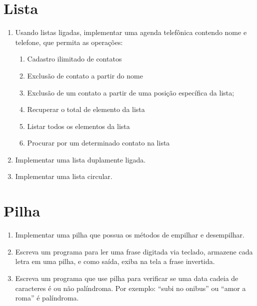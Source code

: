 \documentclass[11pt]{article}
\begin{document}
\newpage
\section{Lista}

\begin{enumerate}
	
	\item Usando listas ligadas, implementar uma agenda telefônica contendo nome e telefone, que permita as operações:
	
	\begin{enumerate}
		
		\item Cadastro ilimitado de contatos
		
		\item Exclusão de contato a partir do nome
		
		\item Exclusão de um contato a partir de uma posição específica da lista;
		
		\item Recuperar o total de elemento da lista
		
		\item Listar todos os elementos da lista
		
		\item Procurar por um determinado contato na lista
		
	\end{enumerate}
	
	\item Implementar uma lista duplamente ligada.
	
	\item Implementar uma lista circular.
\end{enumerate}

\newpage
\section{Pilha}

\begin{enumerate}
	
	\item Implementar uma pilha que possua os métodos de empilhar e desempilhar.
	
	\item Escreva um programa para ler uma frase digitada via teclado, armazene cada letra em uma pilha, e como saída, exiba na tela a frase invertida.
	
	\item Escreva um programa que use pilha para verificar se uma data cadeia de caracteres é ou não palíndroma. Por exemplo: ``subi no onibus'' ou ``amor a roma'' é palíndroma.
	
\end{enumerate}
\end{document}

